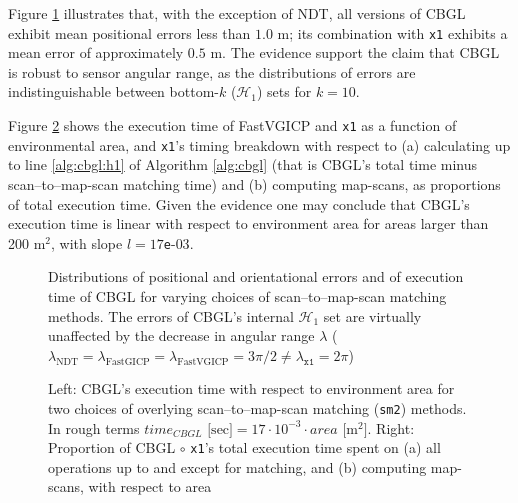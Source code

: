Figure \ref{fig:c:errors_and_time} illustrates that, with the exception of
NDT, all versions of CBGL exhibit mean positional errors less than $1.0$ m; its
combination with \texttt{x1} exhibits a mean error of approximately $0.5$ m.
The evidence support the claim that CBGL is robust to sensor angular range,
as the distributions of errors are indistinguishable between bottom-$k$
($\mathcal{H}_1$) sets for $k=10$.

Figure \ref{fig:c:time_analysis} shows the execution time of FastVGICP and
\texttt{x1} as a function of environmental area, and \texttt{x1}'s timing
breakdown with respect to (a) calculating up to line \ref{alg:cbgl:h1} of
Algorithm \ref{alg:cbgl} (that is CBGL's total time minus scan--to--map-scan
matching time) and (b) computing map-scans, as proportions of total execution
time. Given the evidence one may conclude that CBGL's execution time is linear
with respect to environment area for areas larger than 200 m$^2$, with slope
$l = 17$\texttt{e}-$03$.

\begin{figure}
  
  \vspace{0.1cm}
  \caption{\small Distributions of positional and orientational errors and of
           execution time of CBGL for varying choices of scan--to--map-scan
           matching methods. The errors of CBGL's internal $\mathcal{H}_1$ set
           are virtually unaffected by the decrease in angular range $\lambda$
           ($\lambda_{\text{NDT}} = \lambda_{\text{FastGICP}} =
           \lambda_{\text{FastVGICP}} = 3\pi/2 \neq \lambda_{\texttt{x1}} = 2\pi$)
           }
  \label{fig:c:errors_and_time}
\end{figure}

\begin{figure}
  \vspace{0.5cm}
  
  \vspace{0.2cm}
  \caption{\small Left: CBGL's execution time with respect to environment area
           for two choices of overlying scan--to--map-scan matching
           (\texttt{sm2}) methods. In rough terms
           $time_{CBGL} \text{ [sec]} = 17\cdot10^{-3}\cdot area \text{ [} \text{m}^2 \text{]}$.
           Right: Proportion of CBGL $\circ$ \texttt{x1}'s total execution time
           spent on (a) all operations up to and except for matching, and (b)
           computing map-scans, with respect to area}
  \label{fig:c:time_analysis}
\end{figure}
